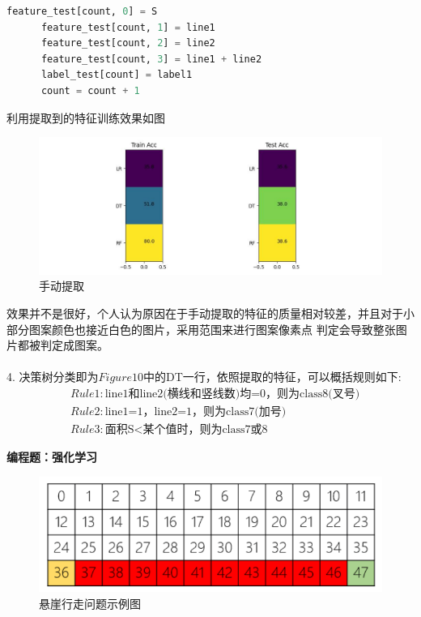 \documentclass[answers]{exam}  %
\begin{document}
\begin{questions}
\begin{lstlisting}[language={Python}]
      feature_test[count, 0] = S
      feature_test[count, 1] = line1
      feature_test[count, 2] = line2
      feature_test[count, 3] = line1 + line2
      label_test[count] = label1
      count = count + 1
		\end{lstlisting}
利用提取到的特征训练效果如图
\begin{figure}[h]
	\centering
	\includegraphics[width=0.7\linewidth]{problem2-code/feature-get.jpg}
	\caption{手动提取}
\end{figure}
效果并不是很好，个人认为原因在于手动提取的特征的质量相对较差，并且对于小部分图案颜色也接近白色的图片，采用范围来进行图案像素点
判定会导致整张图片都被判定成图案。\\
~\\
4. 决策树分类即为$Figure10$中的DT一行，依照提取的特征，可以概括规则如下:\\
\begin{align*}
&Rule1:\mbox{line1和line2(横线和竖线数)均=0，则为class8(叉号)}\\
&Rule2:\mbox{line1=1，line2=1，则为class7(加号)}\\
&Rule3:\mbox{面积S<某个值时，则为class7或8}
\end{align*}

\newpage
\question [30] \textbf{编程题：强化学习}
	\begin{figure}[h]
		\centering
		\includegraphics[width=0.7\linewidth]{problem3-code/env.PNG}
		\caption{悬崖行走问题示例图} \label{fig:q3-env}
	\end{figure}


\end{questions}
\end{document}
